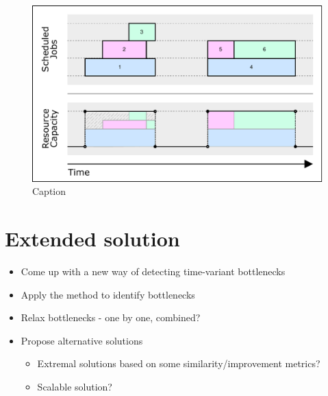\begin{figure}[p]\centering
\includegraphics[width=\textwidth]{img/Capacities-RCPSP.pdf}
\caption{Caption}
\end{figure}

\section{Extended solution}

\begin{itemize}
    \item Come up with a new way of detecting time-variant bottlenecks
    \item Apply the method to identify bottlenecks
    \item Relax bottlenecks - one by one, combined?
    \item Propose alternative solutions
    \begin{itemize}
        \item Extremal solutions based on some similarity/improvement metrics?
        \item Scalable solution?
    \end{itemize}
\end{itemize}
